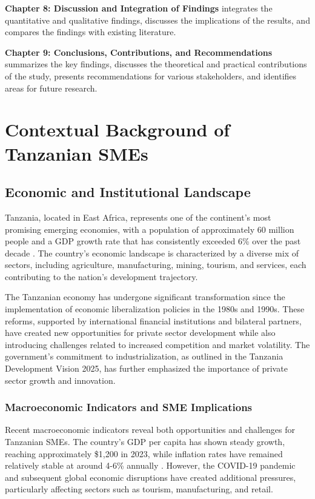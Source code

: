 \documentclass[12pt,a4paper]{article}
\begin{document}
\textbf{Chapter 8: Discussion and Integration of Findings} integrates the quantitative and qualitative findings, discusses the implications of the results, and compares the findings with existing literature.

\textbf{Chapter 9: Conclusions, Contributions, and Recommendations} summarizes the key findings, discusses the theoretical and practical contributions of the study, presents recommendations for various stakeholders, and identifies areas for future research.

\chapter{Contextual Background of Tanzanian SMEs}

\section{Economic and Institutional Landscape}

Tanzania, located in East Africa, represents one of the continent's most promising emerging economies, with a population of approximately 60 million people and a GDP growth rate that has consistently exceeded 6\% over the past decade \cite{worldbank2023tanzania}. The country's economic landscape is characterized by a diverse mix of sectors, including agriculture, manufacturing, mining, tourism, and services, each contributing to the nation's development trajectory.

The Tanzanian economy has undergone significant transformation since the implementation of economic liberalization policies in the 1980s and 1990s. These reforms, supported by international financial institutions and bilateral partners, have created new opportunities for private sector development while also introducing challenges related to increased competition and market volatility. The government's commitment to industrialization, as outlined in the Tanzania Development Vision 2025, has further emphasized the importance of private sector growth and innovation.

\subsection{Macroeconomic Indicators and SME Implications}

Recent macroeconomic indicators reveal both opportunities and challenges for Tanzanian SMEs. The country's GDP per capita has shown steady growth, reaching approximately \$1,200 in 2023, while inflation rates have remained relatively stable at around 4-6\% annually \cite{tanzania2023economic}. However, the COVID-19 pandemic and subsequent global economic disruptions have created additional pressures, particularly affecting sectors such as tourism, manufacturing, and retail.
\end{document}
